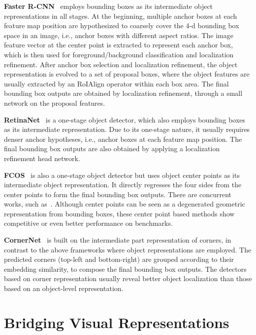 \documentclass{article}
\def\ie{{i.e.}}
\begin{document}
{\noindent \textbf{Faster R-CNN}}~\cite{ren2015faster} employs bounding boxes as its intermediate object representations in all stages. At the beginning, multiple anchor boxes at each feature map position are hypothesized to coarsely cover the 4-d bounding box space in an image, \ie,  anchor boxes with different aspect ratios. The image feature vector at the center point is extracted to represent each anchor box, which is then used for foreground/background classification and localization refinement. After anchor box selection and localization refinement, the object representation is evolved to a set of proposal boxes, where the object features are usually extracted by an RoIAlign operator within each box area. The final bounding box outputs are obtained by localization refinement, through a small network on the proposal features.

{\noindent \textbf{RetinaNet}}~\cite{RetinaNet} is a one-stage object detector, which also employs bounding boxes as its intermediate representation. Due to its one-stage nature, it usually requires denser anchor hypotheses, \ie,  anchor boxes at each feature map position. The final bounding box outputs are also obtained by applying a localization refinement head network.

{\noindent \textbf{FCOS}}~\cite{FCOS} is also a one-stage object detector but uses object center points as its intermediate object representation. It directly regresses the four sides from the center points to form the final bounding box outputs. There are concurrent works, such as~\cite{CenterNet,DBLP:journals/corr/abs-1904-03797,RepPoints}. Although center points can be seen as a degenerated geometric representation from bounding boxes, these center point based methods show competitive or even better performance on benchmarks. 

{\noindent \textbf{CornerNet}}~\cite{CornerNet} is built on the intermediate part representation of corners, in contrast to the above frameworks where object representations are employed. The predicted corners (top-left and bottom-right) are grouped according to their embedding similarity, to compose the final bounding box outputs. The detectors based on corner representation usually reveal better object localization than those based on an object-level representation.
 
\vspace{-.5em}

\section{Bridging Visual Representations}
\end{document}
